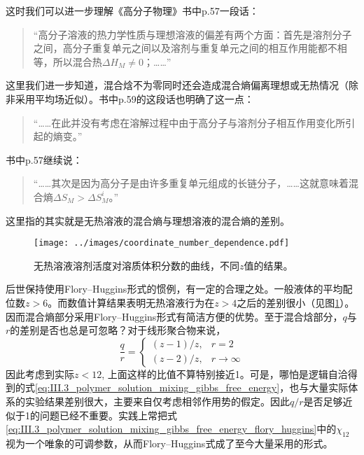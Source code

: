 \documentclass[main.tex]{subfiles}
\begin{document}
这时我们可以进一步理解《高分子物理》书中p.57一段话：
\begin{quotation}
  “高分子溶液的热力学性质与理想溶液的偏差有两个方面：首先是溶剂分子之间，高分子重复单元之间以及溶剂与重复单元之间的相互作用能都不相等，所以混合热$\Delta H_M\neq 0$；……”
\end{quotation}
这里我们进一步知道，混合焓不为零同时还会造成混合熵偏离理想或无热情况（除非采用平均场近似）。书中p.59的这段话也明确了这一点：
\begin{quotation}
  “……在此并没有考虑在溶解过程中由于高分子与溶剂分子相互作用变化所引起的熵变。”
\end{quotation}
书中p.57继续说：
\begin{quotation}
  “……其次是因为高分子是由许多重复单元组成的长链分子，……这就意味着混合熵$\Delta S_M>\Delta S_M^i$。”
\end{quotation}
这里指的其实就是无热溶液的混合熵与理想溶液的混合熵的差别。

\begin{figure}[ht]
  \centering
  \texttt{[image: ../images/coordinate\_number\_dependence.pdf]}
  \caption{无热溶液溶剂活度对溶质体积分数的曲线，不同$z$值的结果\cite{Tompa1956}。}
  \label{fig:coordinate_number_dependence}
\end{figure}

后世保持使用Flory--Huggins形式的惯例，有一定的合理之处。一般液体的平均配位数$z>6$。而数值计算结果表明无热溶液行为在$z>4$之后的差别很小（见图\ref{fig:coordinate_number_dependence}）。因而混合熵部分采用Flory--Huggins形式有简洁方便的优势。至于混合焓部分，$q$与$r$的差别是否也总是可忽略？对于线形聚合物来说，
\[
  \frac{q}{r}=\left\{\begin{array}{ll}\left(z-1\right)/z,& r=2\\\left(z-2\right)/z,&r\to\infty\end{array}\right.
\]
因此考虑到实际$z<12$, 上面这样的比值不算特别接近1。可是，哪怕是逻辑自洽得到的式\eqref{eq:III.3_polymer_solution_mixing_gibbs_free_energy}，也与大量实际体系的实验结果差别很大，主要来自仅考虑相邻作用势的假定。因此$q/r$是否足够近似于1的问题已经不重要。实践上常把式\eqref{eq:III.3_polymer_solution_mixing_gibbs_free_energy_flory_huggins}中的$\chi_{12}$视为一个唯象的可调参数，从而Flory--Huggins式成了至今大量采用的形式。
\end{document}
